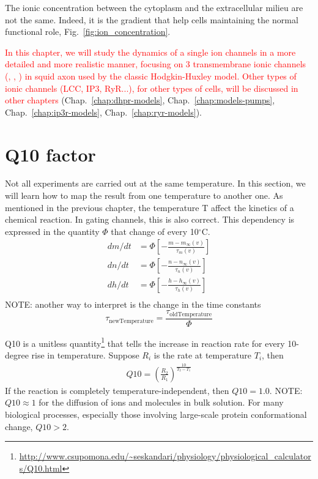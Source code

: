 The ionic concentration between the cytoplasm and the extracellular
milieu are not the same. Indeed, it is the gradient that help cells
maintaining the normal functional role,
Fig.~\ref{fig:ion_concentration}.



\textcolor{red}{In this chapter, we will study the dynamics of a
single ion channels in a more detailed and more realistic manner,
focusing on 3 transmembrane ionic channels (, ,
) in squid axon used by the classic Hodgkin-Huxley
model. Other types of ionic channels (LCC, IP3, RyR...), for other
types of cells, will be discussed in other chapters}
(Chap.~\ref{chap:dhpr-models}, Chap.~\ref{chap:models-pumps},
Chap.~\ref{chap:ip3r-models}, Chap.~\ref{chap:ryr-models}).




\section{Q10 factor}
\label{sec:q10-factor}


Not all experiments are carried out at the same temperature. In this section, we
will learn how to map the result from one temperature to another one.
As mentioned in the previous chapter, the temperature T affect the kinetics of a
chemical reaction. In gating channels, this is also correct.
This dependency is expressed in the quantity $\Phi$ that change of every
10$^\circ$C.
\begin{equation*}
  \begin{split}
    dm/dt &= \Phi[-\frac{m-m_\infty(v)}{\tau_m(v)}]\\
    dn/dt &= \Phi[-\frac{n-n_\infty(v)}{\tau_n(v)}]\\
    dh/dt &= \Phi[-\frac{h-h_\infty(v)}{\tau_h(v)}]\\
  \end{split}
\end{equation*}
NOTE: another way to interpret is the change in the time constants
\begin{equation}
\tau_\text{newTemperature} = \frac{\tau_\text{oldTemperature}}{\Phi}
\end{equation}

\begin{framed}
  Q10 is a unitless
  quantity\footnote{\url{http://www.csupomona.edu/~seskandari/physiology/physiological_calculators/Q10.html}}
  that tells the increase in reaction rate for every 10-degree rise in
  temperature. Suppose $R_i$ is the rate at temperature $T_i$, then
  \begin{eqnarray*}
    Q10 = \left(\frac{R_2}{R_1}\right)^{\frac{10}{T_2-T_1}}
  \end{eqnarray*}
  If the reaction is completely temperature-independent, then
  $Q10=1.0$. NOTE: $Q10 \approx 1$ for the diffusion of ions and
  molecules in bulk solution. For many biological processes, especially
  those involving large-scale protein conformational change, $Q10 > 2$.
\end{framed}

